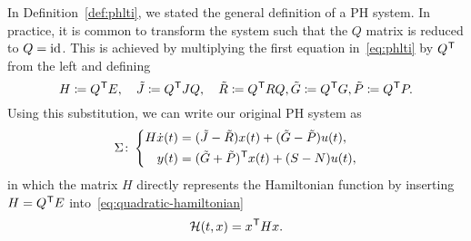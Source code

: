 \begin{remark}
    In Definition~\ref{def:phlti}, we stated the general definition of a \ac{PH} system.
    In practice, it is common to transform the system such that the $Q$ matrix is reduced to $Q = \text{id}_{}$.
    This is achieved by multiplying the first equation in~\eqref{eq:phlti} by $Q^{\mkern1mu \mathsf{T}}$ from the left and defining
    \begin{equation*}
        H \coloneqq Q^{\mkern1mu \mathsf{T}} E,\quad \tilde{J} \coloneqq Q^{\mkern1mu \mathsf{T}} J Q,\quad \tilde{R} \coloneqq Q^{\mkern1mu \mathsf{T}} R Q, \tilde{G} \coloneqq Q^{\mkern1mu \mathsf{T}} G, \tilde{P} \coloneqq Q^{\mkern1mu \mathsf{T}} P.
    \end{equation*}
    Using this substitution, we can write our original \ac{PH} system as
    \begin{equation*}
        \Sigma \colon \left\lbrace
        \begin{aligned}
            H \dot{x}(t) &= (\tilde{J} - \tilde{R}) x(t) + (\tilde{G} - \tilde{P}) u(t), \\
            y(t) &= (\tilde{G} + \tilde{P})^{\mkern1mu \mathsf{T}} x(t) + (S - N) u(t),
        \end{aligned}
        \right.
    \end{equation*}
    in which the matrix $H$ directly represents the Hamiltonian function by inserting $H = Q^{\mkern1mu \mathsf{T}} E$ into~\eqref{eq:quadratic-hamiltonian}
    \begin{equation*}
        \mathcal{H}(t, x) = x^{\mkern1mu \mathsf{T}} H x.
    \end{equation*}
\end{remark}

